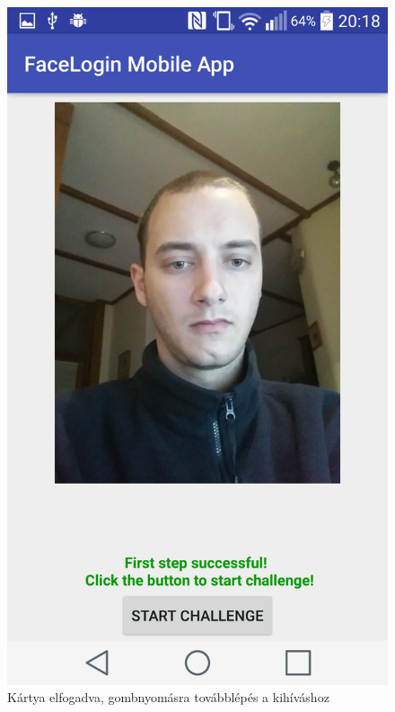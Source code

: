 \begin{figure}[h]
\begin{minipage}{.30\textwidth}
     \includegraphics[scale=0.10]{img/first_step_success}
     \caption{Kártya elfogadva, gombnyomásra továbblépés a kihíváshoz}
 \end{minipage}
 \begin{minipage}{.30\textwidth} 
\centering

\end{minipage}
\end{figure}

